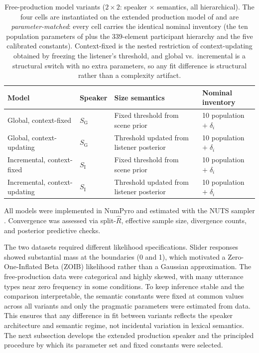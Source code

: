 \documentclass[man,floatsintext]{apa7}
\begin{document}
\begin{table}[htbp]
  \caption{Free-production model variants ($2 \times 2$: speaker $\times$ semantics, all hierarchical).
  The four cells are instantiated on the extended production model of  and are \emph{parameter-matched}: every cell carries the identical nominal inventory (the ten population parameters of  plus the 339-element participant hierarchy and the five calibrated constants).
  Context-fixed is the nested restriction of context-updating obtained by freezing the listener's threshold, and global vs.\ incremental is a structural switch with no extra parameters, so any fit difference is structural rather than a complexity artifact.}
  \label{tab:production-models}
  \centering
  \begin{tabularx}{\textwidth}{llXl}
    \toprule
    \textbf{Model} & \textbf{Speaker} & \textbf{Size semantics} & \textbf{Nominal inventory} \\
    \midrule
    Global, context-fixed & $S_\text{G}$ & Fixed threshold from scene prior & 10 population $+\;\delta_i$ \\
    Global, context-updating & $S_\text{G}$ & Threshold updated from listener posterior & 10 population $+\;\delta_i$ \\
    Incremental, context-fixed & $S_\text{I}$ & Fixed threshold from scene prior & 10 population $+\;\delta_i$ \\
    Incremental, context-updating & $S_\text{I}$ & Threshold updated from listener posterior & 10 population $+\;\delta_i$ \\
    \bottomrule
  \end{tabularx}
\end{table}

All models were implemented in NumPyro \citep{phan2019composable} and estimated with the NUTS sampler \citep{hoffman2014no}.
Convergence was assessed via split-$\hat{R}$, effective sample size, divergence counts, and posterior predictive checks.

The two datasets required different likelihood specifications.
Slider responses showed substantial mass at the boundaries (0 and 1), which motivated a Zero-One-Inflated Beta (ZOIB) likelihood rather than a Gaussian approximation.
The free-production data were categorical and highly skewed, with many utterance types near zero frequency in some conditions.
To keep inference stable and the comparison interpretable, the semantic constants were fixed at common values across all variants and only the pragmatic parameters were estimated from data.
This ensures that any difference in fit between variants reflects the speaker architecture and semantic regime, not incidental variation in lexical semantics.
The next subsection develops the extended production speaker and the principled procedure by which its parameter set and fixed constants were selected.
\end{document}
